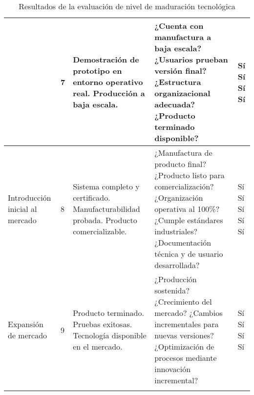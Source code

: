 \begin{longtable}{|p{2.5cm}|p{0.5cm}|p{4cm}|p{4cm}|p{1cm}|}
& 7 &
Demostración de prototipo en entorno operativo real. Producción a baja escala. &
¿Cuenta con manufactura a baja escala? \newline
¿Usuarios prueban versión final? \newline
¿Estructura organizacional adecuada? \newline
¿Producto terminado disponible? &
Sí \newline Sí \newline Sí \newline Sí \\
\hline

Introducción inicial al mercado & 8 &
Sistema completo y certificado. Manufacturabilidad probada. Producto comercializable. &
¿Manufactura de producto final? \newline
¿Producto listo para comercialización? \newline
¿Organización operativa al 100\%? \newline
¿Cumple estándares industriales? \newline
¿Documentación técnica y de usuario desarrollada? &
Sí \newline Sí \newline Sí \newline Sí \newline Sí \\
\hline

Expansión de mercado & 9 &
Producto terminado. Pruebas exitosas. Tecnología disponible en el mercado. &
¿Producción sostenida? \newline
¿Crecimiento del mercado? \newline
¿Cambios incrementales para nuevas versiones? \newline
¿Optimización de procesos mediante innovación incremental? &
Sí \newline Sí \newline Sí \newline Sí \\
\hline
\caption{Resultados de la evaluación de nivel de maduración tecnológica}
\label{m20}
\end{longtable}

